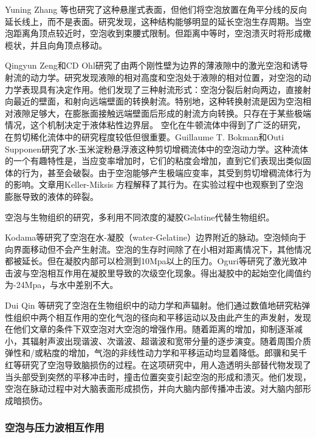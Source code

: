 Yuning Zhang 等也研究了这种悬崖式表面，但他们将空泡放置在角平分线的反向延长线上，而不是表面\cite{zhang_collapsing_2020}。研究发现，这种结构能够明显的延长空泡生存周期。当空泡距离角顶点较近时，空泡收到束腰式限制。但距离中等时，空泡溃灭时将形成橄榄状，并且向角顶点移动。

Qingyun Zeng和CD Ohl研究了由两个刚性壁为边界的薄液隙中的激光空泡和诱导射流的动力学\cite{zeng_splitting_2020}。研究发现液隙的相对高度和空泡处于液隙的相对位置，对空泡的动力学表现具有决定作用。他们发现了三种射流形式：空泡分裂后射向两边，直接射向最近的壁面，和射向远端壁面的转换射流。特别地，这种转换射流是因为空泡相对液隙足够大，在膨胀面接触远端壁面后形成的射流方向转换。只存在于某些极端情况，这个机制决定于液体粘性边界层。
空化在牛顿流体中得到了广泛的研究，在剪切稀化流体中的研究程度较低但很重要。Guillaume T. Bokman和Outi Supponen研究了水-玉米淀粉悬浮液这种剪切增稠流体中的空泡动力学\cite{bokman_cavitation_2022}。这种流体的一个有趣特性是，当应变率增加时，它们的粘度会增加，直到它们表现出类似固体的行为，甚至会破裂。由于空泡能够产生极端应变率，其受到剪切增稠流体行为的影响。文章用Keller-Miksis 方程解释了其行为。在实验过程中也观察到了空泡膨胀导致的液体的碎裂。

空泡与生物组织的研究，多利用不同浓度的凝胶Gelatine代替生物组织。

Kodama等研究了空泡在水-凝胶（water-Gelatine）边界附近的脉动\cite{kodama_cavitation_2000}。空泡倾向于向界面移动但不会产生射流。空泡的生存时间除了在小相对距离情况下，其他情况都被延长。但在凝胶内部可以检测到10Mpa以上的压力。Oguri等研究了激光致冲击波与空泡相互作用在凝胶里导致的次级空化现象\cite{oguri_cavitation_2018}。得出凝胶中的起始空化阈值约为-24Mpa，与水中差别不大。

Dui Qin 等研究了空泡在生物组织中的动力学和声辐射\cite{qin_nonlinear_2021}。他们通过数值地研究粘弹性组织中两个相互作用的空化气泡的径向和平移运动以及由此产生的声发射，发现在他们文章的条件下双空泡对大空泡的增强作用。随着距离的增加，抑制逐渐减小，其辐射声波出现谐波、次谐波、超谐波和宽带分量的逐步演变。随着周围介质弹性和/或粘度的增加，气泡的非线性动力学和平移运动均显着降低。郎骥和吴千红等研究了空泡导致脑损伤的过程\cite{lang_cavitation_2021}。在这项研究中，用人造透明头部替代物发现了当头部受到突然的平移冲击时，撞击位置突变引起空泡的形成和溃灭。他们发现，空泡在脉动过程中对大脑表面形成损伤，并向大脑内部传播冲击波。对大脑内部形成暗损伤。
\medskip
\bigskip
\subsubsection{空泡与压力波相互作用}


